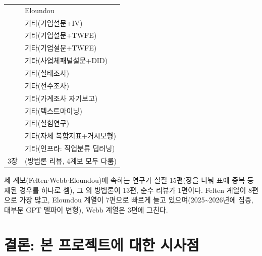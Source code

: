 \documentclass[11pt]{article}
\begin{document}
\begin{longtable}{L{6.2cm}L{9.5cm}}
\citet{son-2025-llm-based-ai-job-exposure-measurement} & Eloundou\\
\citet{kiet-2021-ai-adoption-productivity} & 기타(기업설문+IV)\\
\citet{kiet-2024-ai-adoption-firms-policy} & 기타(기업설문+TWFE)\\
\citet{kim-2025-ai-adoption-firm-performance} & 기타(기업설문+TWFE)\\
\citet{lee-2025-ai-adoption-determinants-performance} & 기타(사업체패널설문+DID)\\
\citet{kim-2021-ai-adoption-status-major-industries} & 기타(실태조사)\\
\citet{spri-2024-ai-industry-survey} & 기타(전수조사)\\
\citet{bok-2026-ai-adoption-productivity-effects} & 기타(가계조사 자기보고)\\
\citet{seo-2025-ai-adoption-characteristics-business-reports} & 기타(텍스트마이닝)\\
\citet{min-2025-productivity-gains-generative-ai} & 기타(실험연구)\\
\citet{nam-2026-ai-macroeconomic-impact-analysis} & 기타(자체 복합지표+거시모형)\\
\citet{chang-2022-deep-learning-job-classification-system} & 기타(인프라: 직업분류 딥러닝)\\
\citet{lee-2024-generative-ai-labor-market-measurement} 3장 & (방법론 리뷰, 4계보 모두 다룸)\\

\end{longtable}

세 계보(Felten$\cdot$Webb$\cdot$Eloundou)에 속하는 연구가 실질 15편(장을 나눠 표에 중복 등재된 경우를 하나로 셈), 그 외 방법론이 13편, 순수 리뷰가 1편이다. Felten 계열이 8편으로 가장 많고, Eloundou 계열이 7편으로 빠르게 늘고 있으며(2025\textasciitilde 2026년에 집중, 대부분 GPT 델파이 변형), Webb 계열은 3편에 그친다.

\section{결론: 본 프로젝트에 대한 시사점}
\end{document}
